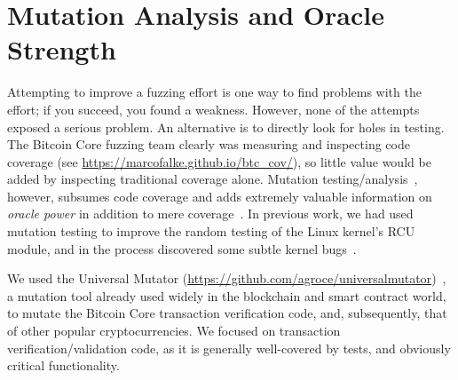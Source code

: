 \section{Mutation Analysis and Oracle Strength}

\lstset{style=langstyle}

Attempting to improve a fuzzing effort is one way to find problems
with the effort; if you succeed, you found a weakness.  However, none
of the attempts exposed a serious problem.  An alternative is
to directly look for holes in testing.  The Bitcoin Core fuzzing team
clearly was measuring and inspecting code coverage (see \url{https://marcofalke.github.io/btc_cov/}), so little value
would be added by inspecting traditional coverage alone.  Mutation
testing/analysis~\cite{MutationSurvey}, however, subsumes code coverage and adds extremely
valuable information on \emph{oracle power} in addition to mere
coverage~\cite{Discontents}.    In previous work, we had
used mutation testing to improve the random testing of the Linux
kernel's RCU module, and in the process discovered some subtle kernel bugs~\cite{mutKernel,groce2018verified}.

\begin{sloppypar}
We used the Universal Mutator
\noindent(\url{https://github.com/agroce/universalmutator})~\cite{regexpMut}, a
mutation tool already used widely in the blockchain and smart contract world, to
mutate the Bitcoin Core transaction
verification code, and, subsequently, that of other popular cryptocurrencies. We focused on transaction verification/validation code, as it is generally well-covered by
tests, and obviously critical functionality.
\end{sloppypar}


